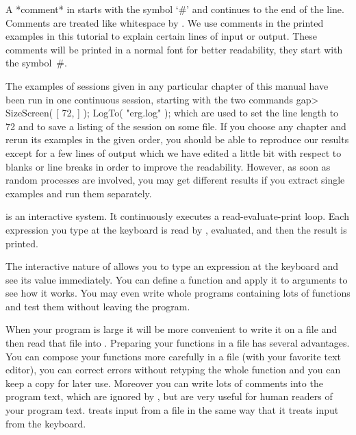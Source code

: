 %
A *comment* in  {\GAP} starts with the  symbol `\#' and continues to  the
end of the line. Comments are  treated like whitespace  by {\GAP}. We use
comments in   the printed examples  in this  tutorial to  explain certain
lines of input or output. These comments will be printed in a normal font
for better readability, they start with the symbol~\#.

The examples of  {\GAP} sessions given  in any particular chapter of this
manual have been  run in one continuous   session, starting with the  two
commands
\begintt
    gap> SizeScreen( [ 72, ] ); LogTo( "erg.log" );
\endtt
which are used to set the line length to 72 and to save  a listing of the
session on some file. If you choose any chapter and rerun its examples in
the given order, you should be able to reproduce our results except for a
few lines of  output which we have edited  a  little bit with respect  to
blanks  or line breaks in order  to  improve the readability. However, as
soon as random processes  are involved, you may  get different results if
you extract single examples and run them separately.

\null

%
{\GAP}  is  an   interactive   system.    It  continuously   executes   a
read-evaluate-print loop.  Each  expression you type  at the  keyboard is
read by {\GAP}, evaluated, and then the result is printed.

The interactive nature of {\GAP} allows you to type  an expression at the
keyboard and see its value immediately.  You can  define a  function  and
apply it to arguments  to  see how  it  works.  You may  even write whole
programs containing lots  of functions and test them without leaving  the
program.

When  your program is large it  will be more  convenient to write it on a
file and then read that file  into {\GAP}. Preparing  your functions in a
file   has  several advantages.  You  can   compose  your functions  more
carefully in a  file (with your favorite  text  editor), you can  correct
errors without retyping  the whole function and you  can keep a  copy for
later use. Moreover you can write lots of comments into the program text,
which are ignored  by {\GAP}, but are   very useful for  human readers of
your program text. {\GAP} treats  input from a  file in the same way that
it treats input from the keyboard.

